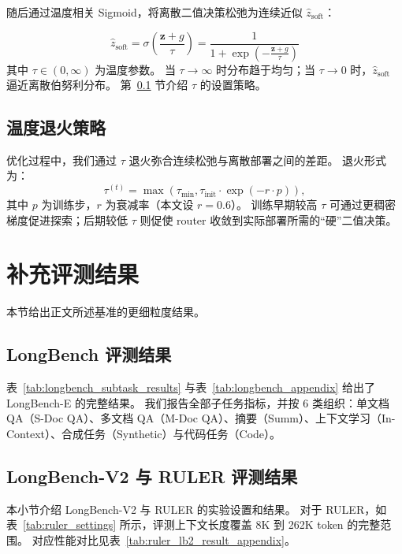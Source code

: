 随后通过温度相关 Sigmoid，将离散二值决策松弛为连续近似 $\hat{z}_{\text{soft}}$：

\begin{equation}
\hat{z}_{\text{soft}} = \sigma \left( \frac{\mathbf{z} + g}{\tau} \right) = \frac{1}{1 + \exp\left( -\frac{\mathbf{z} + g}{\tau} \right)}
\end{equation}
其中 $\tau \in (0, \infty)$ 为温度参数。
当 $\tau \to \infty$ 时分布趋于均匀；当 $\tau \to 0$ 时，$\hat{z}_{\text{soft}}$ 逼近离散伯努利分布。
第~\ref{appdix:subsec_tau} 节介绍 $\tau$ 的设置策略。


\subsection{温度退火策略}
\label{appdix:subsec_tau}
优化过程中，我们通过 $\tau$ 退火弥合连续松弛与离散部署之间的差距。
退火形式为：
\begin{equation}
\tau^{(t)} = \max(\tau_{\text{min}}, \tau_{\text{init}} \cdot \exp(-r \cdot p)),
\end{equation}
其中 $p$ 为训练步，$r$ 为衰减率（本文设 $r=0.6$）。
训练早期较高 $\tau$ 可通过更稠密梯度促进探索；后期较低 $\tau$ 则促使 router 收敛到实际部署所需的“硬”二值决策。


\section{补充评测结果}
\label{appdix:eval_res}
本节给出正文所述基准的更细粒度结果。

\subsection{LongBench 评测结果}

表~\ref{tab:longbench_subtask_results} 与表~\ref{tab:longbench_appendix} 给出了 LongBench-E 的完整结果。
我们报告全部子任务指标，并按 6 类组织：单文档 QA（S-Doc QA）、多文档 QA（M-Doc QA）、摘要（Summ）、上下文学习（In-Context）、合成任务（Synthetic）与代码任务（Code）。

\subsection{LongBench-V2 与 RULER 评测结果}
本小节介绍 LongBench-V2 与 RULER 的实验设置和结果。
对于 RULER，如表~\ref{tab:ruler_settings} 所示，评测上下文长度覆盖 8K 到 262K token 的完整范围。
对应性能对比见表~\ref{tab:ruler_lb2_result_appendix}。

